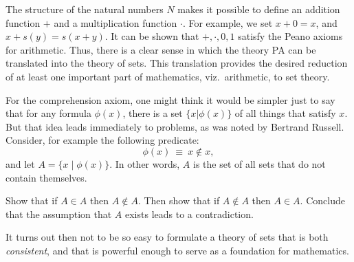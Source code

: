 The structure of the natural numbers $N$ makes it possible to define
an addition function $+$ and a multiplication function $\cdot$.  For
example, we set $x+0=x$, and $x+s(y)=s(x+y)$.  It can be shown that
$+,\cdot ,0,1$ satisfy the Peano axioms for arithmetic.  Thus, there
is a clear sense in which the theory PA can be translated into the
theory of sets.  This translation provides the desired reduction of at
least one important part of mathematics, viz.\ arithmetic, to set
theory.

For the comprehension axiom, one might think it would be simpler just
to say that for any formula $\phi (x)$, there is a set $\{ x | \phi
(x) \}$ of all things that satisfy $x$.  But that idea leads
immediately to problems, as was noted by Bertrand Russell.  Consider,
for example the following predicate:
\[ \phi (x)\: \equiv \: x\not\in x , \] and let
$A=\{ x\mid \phi (x)\}$.  In other words, $A$ is the set of all sets
that do not contain themselves.  

\begin{exercise} Show that if $A\in A$ then $A\not\in A$.  Then show
  that if $A\not\in A$ then $A\in A$.  Conclude that the assumption
  that $A$ exists leads to a contradiction. \end{exercise}

It turns out then not to be so easy to formulate a theory of sets that
is both \emph{consistent}, and that is powerful enough to serve as a
foundation for mathematics.


